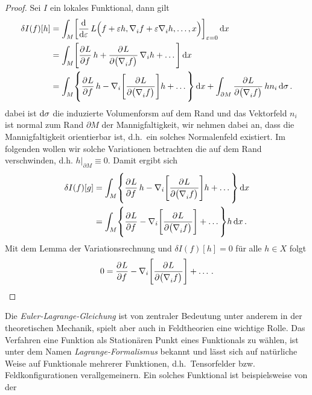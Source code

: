 \begin{proof}
Sei $I$ ein lokales Funktional, dann gilt
\begin{equation}
\begin{split}
\delta {I}(f)[h]&=\int_M \left[\dod{}{\varepsilon}L\Big(f+\varepsilon
h,\tensor{\nabla}{_i} f+\varepsilon\tensor{\nabla}{_i} h,\dots,x\Big)
\right]_{\varepsilon=0}
\dif x\\
&=\int_M
\left[\dpd{L}{f}h+\dpd{L}{\left(\tensor{\nabla}{_i}f\right)}\nabla_i
h+\dots\right] \dif x\\
&=\int_M
\left\{\dpd{L}{f}h-\nabla_i\left[\dpd{L}{\left(\tensor{\nabla}{_i}f\right)}\right]
h+\dots\right\} \dif x+\int_{\partial
M}\dpd{L}{\left(\tensor{\nabla}{_i}f\right)}h n_i\dif \sigma \,.
\end{split}
\end{equation}
dabei ist $\dif \sigma $ die induzierte Volumenforsm auf dem Rand und
das Vektorfeld $n_i$ ist normal zum Rand
$\partial M$ der Mannigfaltigkeit, wir nehmen dabei an, dass die
Mannigfaltigkeit orientierbar ist, d.h.\ ein solches Normalenfeld existiert.
Im folgenden wollen wir solche Variationen betrachten die auf dem Rand
verschwinden, d.h. $h|_{\partial M}\equiv 0$. Damit ergibt sich
\begin{equation}
\begin{split}
\delta {I}(f)[g]&=\int_M
\left\{\dpd{L}{f}h-\nabla_i\left[\dpd{L}{\left(\tensor{\nabla}{_i}f\right)}\right]
h+\dots\right\} \dif x \\
&=\int_M
\left\{\dpd{L}{f}-\nabla_i\left[\dpd{L}{\left(\tensor{\nabla}{_i}f\right)}\right]
+\dots\right\}h \dif x \,.
\end{split}
\end{equation}
Mit dem Lemma der Variationsrechnung und $\delta I(f) [h]=0$ für alle $h\in X$
folgt
\begin{equation}
0=\dpd{L}{f}-\nabla_i\left[\dpd{L}{\left(\tensor{\nabla}{_i}f\right)}\right]
+\dots\,.
\end{equation}
\end{proof}
Die \emph{Euler-Lagrange-Gleichung} ist von zentraler Bedeutung unter anderem in der theoretischen Mechanik,
spielt aber auch in Feldtheorien eine wichtige Rolle.
Das Verfahren eine Funktion als Stationären Punkt eines Funktionals zu wählen,
ist unter dem Namen \emph{Lagrange-Formalismus} bekannt und lässt sich auf
natürliche Weise auf Funktionale mehrerer Funktionen, d.h.\ Tensorfelder bzw.
Feldkonfigurationen verallgemeinern.
Ein solches Funktional ist beispielsweise von der
